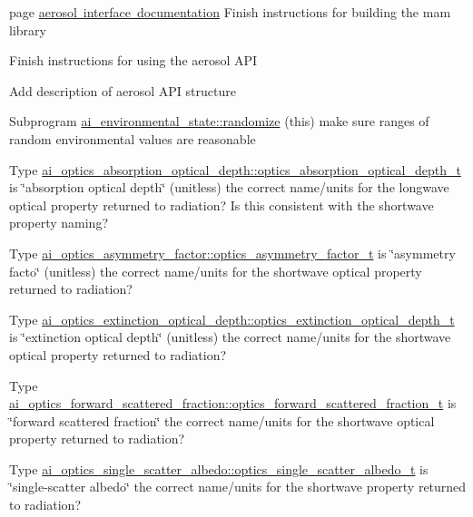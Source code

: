 
\begin{DoxyRefList}
\item[page \mbox{\hyperlink{index}{aerosol interface documentation}} ]\label{todo__todo000001}%
%
Finish instructions for building the mam library

\label{todo__todo000002}%
%
Finish instructions for using the aerosol API

\label{todo__todo000003}%
%
Add description of aerosol API structure 
\item[Subprogram \mbox{\hyperlink{namespaceai__environmental__state_aa7ca7a392b7ea79cdb52ab358d2c4c8a}{ai\+\_\+environmental\+\_\+state\+::randomize}} (this)]\label{todo__todo000004}%
%
make sure ranges of random environmental values are reasonable  
\item[Type \mbox{\hyperlink{structai__optics__absorption__optical__depth_1_1optics__absorption__optical__depth__t}{ai\+\_\+optics\+\_\+absorption\+\_\+optical\+\_\+depth\+::optics\+\_\+absorption\+\_\+optical\+\_\+depth\+\_\+t}} ]\label{todo__todo000005}%
%
is \char`\"{}absorption optical depth\char`\"{} (unitless) the correct name/units for the longwave optical property returned to radiation? Is this consistent with the shortwave property naming?  
\item[Type \mbox{\hyperlink{structai__optics__asymmetry__factor_1_1optics__asymmetry__factor__t}{ai\+\_\+optics\+\_\+asymmetry\+\_\+factor\+::optics\+\_\+asymmetry\+\_\+factor\+\_\+t}} ]\label{todo__todo000006}%
%
is \char`\"{}asymmetry facto\char`\"{} (unitless) the correct name/units for the shortwave optical property returned to radiation?  
\item[Type \mbox{\hyperlink{structai__optics__extinction__optical__depth_1_1optics__extinction__optical__depth__t}{ai\+\_\+optics\+\_\+extinction\+\_\+optical\+\_\+depth\+::optics\+\_\+extinction\+\_\+optical\+\_\+depth\+\_\+t}} ]\label{todo__todo000007}%
%
is \char`\"{}extinction optical depth\char`\"{} (unitless) the correct name/units for the shortwave optical property returned to radiation?  
\item[Type \mbox{\hyperlink{structai__optics__forward__scattered__fraction_1_1optics__forward__scattered__fraction__t}{ai\+\_\+optics\+\_\+forward\+\_\+scattered\+\_\+fraction\+::optics\+\_\+forward\+\_\+scattered\+\_\+fraction\+\_\+t}} ]\label{todo__todo000008}%
%
is \char`\"{}forward scattered fraction\char`\"{} the correct name/units for the shortwave optical property returned to radiation?  
\item[Type \mbox{\hyperlink{structai__optics__single__scatter__albedo_1_1optics__single__scatter__albedo__t}{ai\+\_\+optics\+\_\+single\+\_\+scatter\+\_\+albedo\+::optics\+\_\+single\+\_\+scatter\+\_\+albedo\+\_\+t}} ]\label{todo__todo000009}%
%
is \char`\"{}single-\/scatter albedo\char`\"{} the correct name/units for the shortwave property returned to radiation? 
\end{DoxyRefList}